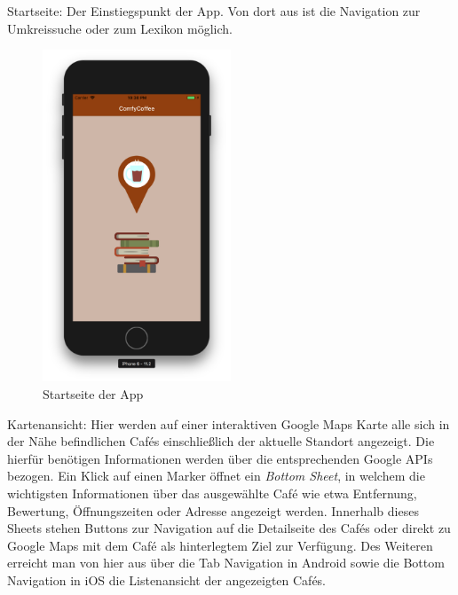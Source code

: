 Startseite:
Der Einstiegspunkt der App.
Von dort aus ist die Navigation zur Umkreissuche oder zum Lexikon möglich.

\begin{figure}[H]
    \centering
		\includegraphics[width=0.5\textwidth]{Bilder/app-startseite.png}
		\caption{Startseite der App}
\end{figure}


Kartenansicht:
Hier werden auf einer interaktiven Google Maps Karte alle sich in der Nähe befindlichen Cafés einschließlich der aktuelle Standort angezeigt.
Die hierfür benötigen Informationen werden über die entsprechenden Google APIs bezogen.
Ein Klick auf einen Marker öffnet ein \emph{Bottom Sheet}, in welchem die wichtigsten Informationen über das ausgewählte Café wie etwa Entfernung, Bewertung, Öffnungszeiten oder Adresse angezeigt werden.
Innerhalb dieses Sheets stehen Buttons zur Navigation auf die Detailseite des Cafés oder direkt zu Google Maps mit dem Café als hinterlegtem Ziel zur Verfügung.
Des Weiteren erreicht man von hier aus über die Tab Navigation in Android sowie die Bottom Navigation in iOS die Listenansicht der angezeigten Cafés.

